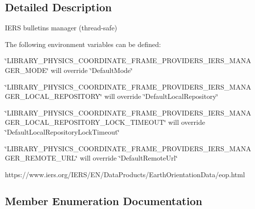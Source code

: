 \subsection{Detailed Description}
I\+E\+RS bulletins manager (thread-\/safe) 

The following environment variables can be defined\+:


\begin{DoxyItemize}
\item \char`\"{}\+L\+I\+B\+R\+A\+R\+Y\+\_\+\+P\+H\+Y\+S\+I\+C\+S\+\_\+\+C\+O\+O\+R\+D\+I\+N\+A\+T\+E\+\_\+\+F\+R\+A\+M\+E\+\_\+\+P\+R\+O\+V\+I\+D\+E\+R\+S\+\_\+\+I\+E\+R\+S\+\_\+\+M\+A\+N\+A\+G\+E\+R\+\_\+\+M\+O\+D\+E\char`\"{} will override \char`\"{}\+Default\+Mode\char`\"{}
\item \char`\"{}\+L\+I\+B\+R\+A\+R\+Y\+\_\+\+P\+H\+Y\+S\+I\+C\+S\+\_\+\+C\+O\+O\+R\+D\+I\+N\+A\+T\+E\+\_\+\+F\+R\+A\+M\+E\+\_\+\+P\+R\+O\+V\+I\+D\+E\+R\+S\+\_\+\+I\+E\+R\+S\+\_\+\+M\+A\+N\+A\+G\+E\+R\+\_\+\+L\+O\+C\+A\+L\+\_\+\+R\+E\+P\+O\+S\+I\+T\+O\+R\+Y\char`\"{} will override \char`\"{}\+Default\+Local\+Repository\char`\"{}
\item \char`\"{}\+L\+I\+B\+R\+A\+R\+Y\+\_\+\+P\+H\+Y\+S\+I\+C\+S\+\_\+\+C\+O\+O\+R\+D\+I\+N\+A\+T\+E\+\_\+\+F\+R\+A\+M\+E\+\_\+\+P\+R\+O\+V\+I\+D\+E\+R\+S\+\_\+\+I\+E\+R\+S\+\_\+\+M\+A\+N\+A\+G\+E\+R\+\_\+\+L\+O\+C\+A\+L\+\_\+\+R\+E\+P\+O\+S\+I\+T\+O\+R\+Y\+\_\+\+L\+O\+C\+K\+\_\+\+T\+I\+M\+E\+O\+U\+T\char`\"{} will override \char`\"{}\+Default\+Local\+Repository\+Lock\+Timeout\char`\"{}
\item \char`\"{}\+L\+I\+B\+R\+A\+R\+Y\+\_\+\+P\+H\+Y\+S\+I\+C\+S\+\_\+\+C\+O\+O\+R\+D\+I\+N\+A\+T\+E\+\_\+\+F\+R\+A\+M\+E\+\_\+\+P\+R\+O\+V\+I\+D\+E\+R\+S\+\_\+\+I\+E\+R\+S\+\_\+\+M\+A\+N\+A\+G\+E\+R\+\_\+\+R\+E\+M\+O\+T\+E\+\_\+\+U\+R\+L\char`\"{} will override \char`\"{}\+Default\+Remote\+Url\char`\"{}
\end{DoxyItemize}

https\+://www.iers.\+org/\+I\+E\+R\+S/\+E\+N/\+Data\+Products/\+Earth\+Orientation\+Data/eop.html 

\subsection{Member Enumeration Documentation}
\mbox{\label{classlibrary_1_1physics_1_1coord_1_1frame_1_1provider_1_1iers_1_1_manager_a84f44554ac04c5e18ed7ff448debf392}} 
